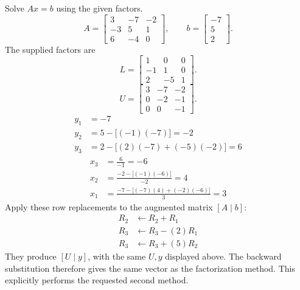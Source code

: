 \goal Solve $Ax=b$ using the given factors.
\[A=\left[\begin{matrix}3 & -7 & -2\\-3 & 5 & 1\\6 & -4 & 0\end{matrix}\right],\qquad b=\left[\begin{matrix}-7\\5\\2\end{matrix}\right].\]
The supplied factors are
\[L=\left[\begin{matrix}1 & 0 & 0\\-1 & 1 & 0\\2 & -5 & 1\end{matrix}\right].\]
\[U=\left[\begin{matrix}3 & -7 & -2\\0 & -2 & -1\\0 & 0 & -1\end{matrix}\right].\]
\begin{align*}y_{1}&=-7\\
y_{2}&=5-\bigl[(-1)(-7)\bigr]=-2\\
y_{3}&=2-\bigl[(2)(-7)+(-5)(-2)\bigr]=6\end{align*}
\begin{align*}x_{3}&=\frac{6}{-1}=-6\\
x_{2}&=\frac{-2-\bigl[(-1)(-6)\bigr]}{-2}=4\\
x_{1}&=\frac{-7-\bigl[(-7)(4)+(-2)(-6)\bigr]}{3}=3\end{align*}
Apply these row replacements to the augmented matrix $[A\mid b]$:
\begin{align*}R_{2}&\leftarrow R_{2}+R_{1}\\
R_{3}&\leftarrow R_{3}-(2)R_{1}\\
R_{3}&\leftarrow R_{3}+(5)R_{2}\end{align*}They produce $[U\mid y]$, with the same $U,y$ displayed above.
The backward substitution therefore gives the same vector as the
factorization method. This explicitly performs the requested second method.

